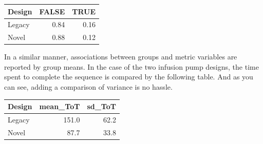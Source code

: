 \documentclass[]{svmono}
\newenvironment{Shaded}{\begin{snugshade}}{\end{snugshade}}
\newcommand{\KeywordTok}[1]{\textcolor[rgb]{0.13,0.29,0.53}{\textbf{#1}}}
\newcommand{\DataTypeTok}[1]{\textcolor[rgb]{0.13,0.29,0.53}{#1}}
\newcommand{\DecValTok}[1]{\textcolor[rgb]{0.00,0.00,0.81}{#1}}
\newcommand{\StringTok}[1]{\textcolor[rgb]{0.31,0.60,0.02}{#1}}
\newcommand{\OperatorTok}[1]{\textcolor[rgb]{0.81,0.36,0.00}{\textbf{#1}}}
\newcommand{\NormalTok}[1]{#1}
\begin{document}
\begin{Shaded}
\end{Shaded}

\begin{tabular}{l|r|r}
\hline
Design & FALSE & TRUE\\
\hline
Legacy & 0.84 & 0.16\\
\hline
Novel & 0.88 & 0.12\\
\hline
\end{tabular}

In a similar manner, associations between groups and metric variables
are reported by group means. In the case of the two infusion pump
designs, the time spent to complete the sequence is compared by the
following table. And as you can see, adding a comparison of variance is
no hassle.

\begin{Shaded}
\end{Shaded}

\begin{tabular}{l|r|r}
\hline
Design & mean\_ToT & sd\_ToT\\
\hline
Legacy & 151.0 & 62.2\\
\hline
Novel & 87.7 & 33.8\\
\hline
\end{tabular}
\end{document}
